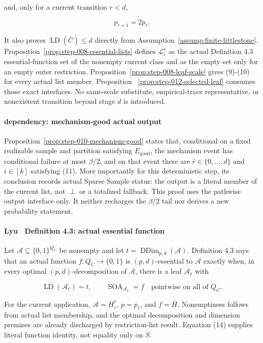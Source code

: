 and, only for a current transition \(r<d\),

\[
 p_{r+1}=2p_r.
\tag{13}
\]

It also proves \(\operatorname{LD}(\bar C)\le d\) directly from
Assumption~\ref{assump:finite-littlestone}. Proposition~\ref{prop:step-008-essential-lists} defines
\(\mathcal L_i^r\) as the actual Definition 4.3 essential-function set of
the nonempty current class and as the empty set only for an empty outer
restriction. Proposition~\ref{prop:step-008-leaf-scale} gives
(9)-(10) for every actual list member. Proposition
~\ref{prop:step-012-selected-leaf} consumes those exact interfaces. No
same-scale substitute, empirical-trace representative, or nonexistent
transition beyond stage \(d\) is introduced.

\paragraph{dependency: mechanism-good actual output}

Proposition~\ref{prop:step-010-mechanism-good} states that,
conditional on a fixed realizable sample and partition satisfying
\(E_{\mathrm{good}}\), the mechanism event has conditional failure at most
\(\beta/2\), and on that event there are
\(\widehat r\in\{0,\ldots,d\}\) and \(i\in[k]\) satisfying (11). More
importantly for this deterministic step, its conclusion records actual
Sparse Sample status: the output is a literal member of the current list,
not \(\perp\) or a totalized fallback. This proof uses the pathwise output
interface only. It neither recharges the \(\beta/2\) tail nor derives a new
probability statement.

\paragraph{Lyu~\citep{lyu2025} Definition 4.3: actual essential function}

Let \(\mathcal A\subseteq\{0,1\}^{Q_C}\) be nonempty and let
\(t=\operatorname{DDim}_{p,d}(\mathcal A)\). Definition 4.3 says that an
actual function \(f:Q_C\to\{0,1\}\) is \((p,d)\)-essential to
\(\mathcal A\) exactly when, in every optimal
\((p,d)\)-decomposition of \(\mathcal A\), there is a leaf
\(\mathcal A_\ell\) with

\[
 \operatorname{LD}(\mathcal A_\ell)=t,
 \qquad
 \operatorname{SOA}_{\mathcal A_\ell}=f
 \quad\text{pointwise on all of }Q_C.
\tag{14}
\]

For the current application,
\(\mathcal A=H_i^{\widehat r}\), \(p=p_{\widehat r}\), and
\(f=\bar H\). Nonemptiness follows from actual list membership, and the
optimal decomposition and dimension premises are already discharged by
restriction-list result. Equation (14) supplies literal function identity, not
equality only on \(\bar S\).

